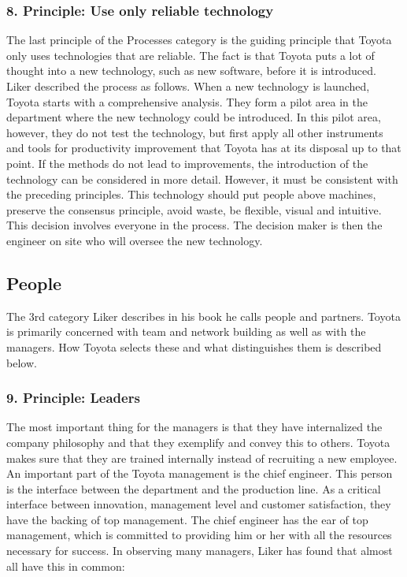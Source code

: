 \documentclass[a4paper,12pt]{scrartcl}
\begin{document}
\subsubsection{8. Principle: Use only reliable technology}

The last principle of the Processes category is the guiding principle that Toyota only uses technologies that are reliable. The fact is that Toyota puts a lot of thought into a new technology, such as new software, before it is introduced. Liker described the process as follows. When a new technology is launched, Toyota starts with a comprehensive analysis. They form a pilot area in the department where the new technology could be introduced. In this pilot area, however, they do not test the technology, but first apply all other instruments and tools for productivity improvement that Toyota has at its disposal up to that point. If the methods do not lead to improvements, the introduction of the technology can be considered in more detail. However, it must be consistent with the preceding principles. This technology should put people above machines, preserve the consensus principle, avoid waste, be flexible, visual and intuitive. This decision involves everyone in the process. The decision maker is then the engineer on site who will oversee the new technology. 

\subsection{People}

The 3rd category Liker describes in his book he calls people and partners. Toyota is primarily concerned with team and network building as well as with the managers. How Toyota selects these and what distinguishes them is described below. 

\subsubsection{9. Principle: Leaders}

The most important thing for the managers is that they have internalized the company philosophy and that they exemplify and convey this to others. Toyota makes sure that they are trained internally instead of recruiting a new employee. An important part of the Toyota management is the chief engineer. This person is the interface between the department and the production line. As a critical interface between innovation, management level and customer satisfaction, they have the backing of top management. The chief engineer has the ear of top management, which is committed to providing him or her with all the resources necessary for success. 
In observing many managers, Liker has found that almost all have this in common:
\end{document}
